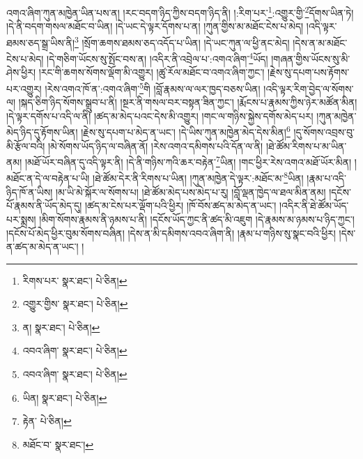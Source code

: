 འགའ་ཞིག་ཀུན་མཁྱེན་ཡིན་པས་ན། །རང་བདག་ཉིད་ཀྱིས་བདག་ཉིད་ནི། །:རིག་པར་\footnote{རིགས་པར་  སྣར་ཐང་།  པེ་ཅིན། }:འགྱུར་གྱི་\footnote{འགྱུར་གྱིས་  སྣར་ཐང་།  པེ་ཅིན། }དོགས་ཡིན་ཏེ། །དེ་ནི་བདག་གསལ་མཐོང་བ་ཡིན། །དེ་ཡང་དེ་ལྟར་དོགས་པ་ན། །ཀུན་གྱིས་མ་མཐོང་ངེས་པ་མེད། །འདི་ལྟར་ཐམས་ཅད་སྒྲ་ཡིས་ནི།\footnote{ན།  སྣར་ཐང་།  པེ་ཅིན། } །སྲོག་ཆགས་ཐམས་ཅད་འདོད་པ་ཡིན། །དེ་ཡང་ཀུན་ལ་ཕྱི་ནང་མེད། །དེས་ན་མ་མཐོང་ངེས་པ་མེད། །དེ་གཅིག་ཡོངས་སུ་སྤོང་བས་ན། །འདིར་ནི་འབྲེལ་པ་:འགའ་ཞིག་\footnote{འབའ་ཞིག་  སྣར་ཐང་།  པེ་ཅིན། }ཡོད། །གཞན་གྱིས་ཡོངས་སུ་མི་ཤེས་ཕྱིར། །རང་གི་ཆགས་སོགས་ལྡོག་མི་འགྱུར། །ཚུ་རོལ་མཐོང་བ་འགའ་ཞིག་ཀྱང་། །རྗེས་སུ་དཔག་པས་རྟོགས་པར་འགྱུར། །རེས་འགའ་ཁོ་ན་:འགའ་ཞིག་\footnote{འབའ་ཞིག་  སྣར་ཐང་།  པེ་ཅིན། }གི །བློ་རྣམས་ལ་ལར་ཁྱད་བཅས་ཡིན། །འདི་ལྟར་རིག་བྱེད་ལ་སོགས་ལ། །སྐད་ཅིག་ཉིད་སོགས་སྒྲུབ་པ་ནི། །སྔར་ནི་གསལ་བར་བསྟན་ཟིན་ཀྱང་། །རྨོངས་པ་རྣམས་ཀྱིས་ཉེར་མཚོན་མིན། །དེ་ལྟར་དགོས་པ་འདི་ལ་ནི། །ཚད་མ་མེད་པའང་དེས་མི་འགྱུར། །གང་ལ་གཉིས་སྐྱེས་དགོས་མེད་པར། །ཀུན་མཁྱེན་མེད་ཉིད་དུ་རྟོགས་ཡིན། །རྗེས་སུ་དཔག་པ་མེད་ན་ཡང་། །དེ་ཡིས་ཀུན་མཁྱེན་མེད་དེས་མིན།\footnote{ཡིན།  སྣར་ཐང་།  པེ་ཅིན། } །དུ་སོགས་འབྲས་བུ་མི་རྩོལ་བའི། །མེ་སོགས་ཡོད་ཉིད་ལ་བཞིན་ནོ། །རེས་འགའ་དམིགས་པའི་དོན་ལ་ནི། །ཐེ་ཚོམ་རིགས་པ་མ་ཡིན་ནམ། །མཐོ་ཡོར་བཞིན་དུ་འདི་ལྟར་ནི། །དེ་ནི་གཉིས་ཀའི་ཆར་བརྟེན་\footnote{རྟེན་  པེ་ཅིན། }ཡིན། །གང་ཕྱིར་རེས་འགའ་མཐོ་ཡོར་མིན། །མཐོང་ན་དེ་ལ་བརྟེན་པ་ཡི། །ཐེ་ཚོམ་དེར་ནི་རིགས་པ་ཡིན། །ཀུན་མཁྱེན་དེ་ལྟར་:མཐོང་མ་\footnote{མཐོང་བ་  སྣར་ཐང་། }ཡིན། །རྣམ་པ་འདི་ཉིད་ཁོ་ན་ཡིས། །མ་ཡི་མེ་སྐོར་ལ་སོགས་པ། །ཐེ་ཚོམ་མེད་པས་མེད་པ་རུ། །བློ་ལྡན་ཁྱེད་ལ་ཐལ་མིན་ནམ། །དངོས་པོ་རྣམས་ནི་ཡོད་མེད་དུ། །ཚད་མ་ངེས་པར་ལྡོག་པའི་ཕྱིར། །ཁོ་བོས་ཚད་མ་མེད་ན་ཡང་། །འདིར་ནི་ཐེ་ཚོམ་ཡོད་པར་སྨྲས། །མིག་སོགས་རྣམས་ནི་ཉམས་པ་ནི། །དངོས་ཡོད་ཀྱང་ནི་ཚད་མི་འཇུག །དེ་རྣམས་མ་ཉམས་པ་ཉིད་ཀྱང་། །དངོས་པོ་མེད་ཕྱིར་བུམ་སོགས་བཞིན། །དེས་ན་མི་དམིགས་འབའ་ཞིག་ནི། །རྣམ་པ་གཉིས་སུ་སྣང་བའི་ཕྱིར། །དེས་ན་ཚད་མ་མེད་ན་ཡང་། །
